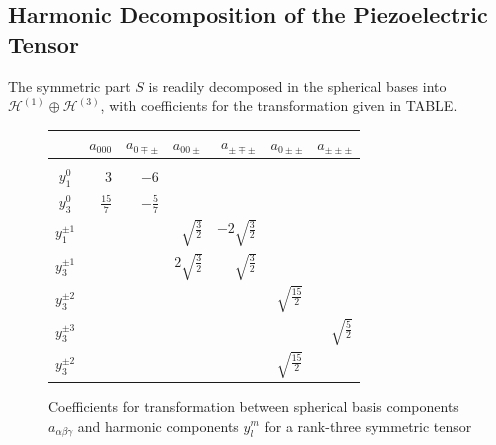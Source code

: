 \documentclass[10pt,a4paper]{article}
\begin{document}
\subsection{Harmonic Decomposition of the Piezoelectric Tensor}

The symmetric part $S$ is readily decomposed in the spherical bases into $\mathcal{H}^{(1)}\oplus \mathcal{H}^{(3)}$, with coefficients for the transformation given in TABLE.
\begin{figure}

\begin{tabular}{c|rrrrrr}
 & $a_{000}$ & $a_{0\mp\pm}$ & $a_{00\pm}$ & $a_{\pm\mp\pm}$  & $a_{0\pm\pm}$ & $a_{\pm\pm\pm}$ \\
 \hline \\ 
$y_1^0$  & $3$ & $-6$ \\
$y_3^0$  & $\frac{15}{7}$ & $-\frac{5}{7}$ \\
$y_1^{\pm 1}$  &  & & $\sqrt{\frac{3}{2}}$ & $-2\sqrt{\frac{3}{2}}$\\
$y_3^{\pm 1}$  &  & & $2\sqrt{\frac{3}{2}}$ & $\sqrt{\frac{3}{2}}$\\
$y_3^{\pm 2}$  &  & & & & $\sqrt{\frac{15}{2}}$\\
$y_3^{\pm 3}$  &  & & & & & $\sqrt{\frac{5}{2}}$\\

 $y_3^{\pm 2}$  &  & & & & $\sqrt{\frac{15}{2}}$\\

 
\end{tabular}

\caption{Coefficients for transformation between spherical basis components $a_{\alpha\beta\gamma}$ and harmonic components $y^m_l$ for a rank-three symmetric tensor}
\end{figure}

\nocite{*}






\end{document}
